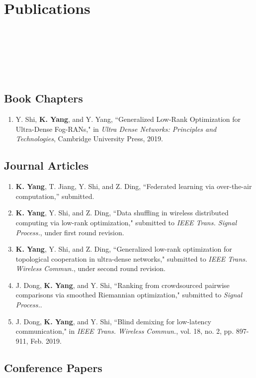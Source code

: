 \documentclass{article}
\begin{document}
\section*{\colorbox{mygrey}{Publications~~~~~~~~~~~~~~~~~~~~~~~~~~~~~~~~~~~~~~~~~~~~~~~~~~~~~~~~~~~~~~~~~~~~~~~~~~~~~~~~~~~~~~~}}

\subsection*{Book Chapters}
\begin{enumerate}
\item Y. Shi, {\bf{K. Yang}}, and Y. Yang,
``Generalized Low-Rank Optimization for Ultra-Dense Fog-RANs," in {\emph{Ultra Dense Networks: Principles and Technologies}}, Cambridge University Press, 2019.
\end{enumerate}

\subsection*{Journal Articles}

\begin{enumerate}
\item {\bf{K. Yang}}, T. Jiang, Y. Shi, and Z. Ding, “Federated learning via over-the-air computation,” submitted.
\item {\bf{K. Yang}}, Y. Shi, and Z. Ding, ``Data shuffling in wireless distributed computing via low-rank optimization,"
submitted to \emph{IEEE Trans. Signal Process.}, under first round revision.
\item {\bf{K. Yang}}, Y. Shi, and Z. Ding, ``Generalized
low-rank optimization for topological cooperation in ultra-dense networks,"
submitted to \emph{IEEE Trans. Wireless Commun.}, under second round revision.
\item {{J. Dong}}, {\bf{K. Yang}}, and Y. Shi, ``Ranking from crowdsourced pairwise comparisons via smoothed Riemannian optimization," submitted to {\emph{Signal Process.}}.
\item J. Dong, {\bf{K. Yang}}, and Y. Shi, ``Blind demixing for low-latency communication," in \emph{IEEE
Trans. Wireless Commun.}, vol. 18, no. 2, pp. 897-911, Feb. 2019.
\end{enumerate}

\subsection*{Conference Papers}
\end{document}
